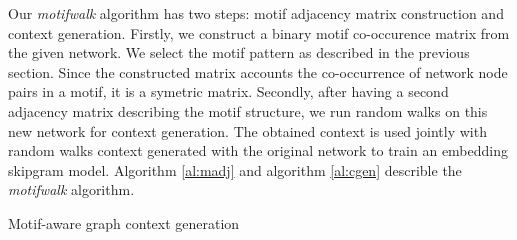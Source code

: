 \documentclass{article}
\theoremstyle{definition}
\begin{document}
Our \emph{motifwalk} algorithm has two steps: motif adjacency matrix
construction and context generation. Firstly, we construct a binary
motif co-occurence matrix from the given network. We select the motif
pattern as described in the previous section. Since the constructed matrix 
accounts the co-occurrence of network node pairs in a motif, it is a symetric
matrix. Secondly, after having a second adjacency matrix describing the
motif structure, we run random walks on this new network for context generation. 
The obtained context is used jointly with random walks context generated with 
the original network to train an embedding skipgram model. Algorithm \ref{al:madj}
and algorithm \ref{al:cgen} describle the \emph{motifwalk} algorithm.
\begin{algorithm}[h] \label{al:cgen}
\caption{Motif-aware graph context generation}
\end{algorithm}
\end{document}
